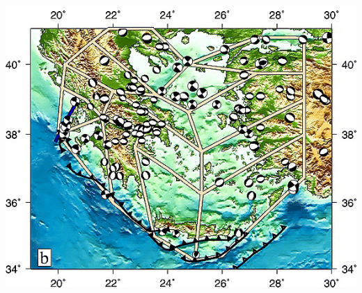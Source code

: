 \begin{frame}[t]
\begin{columns}
\begin{column}{.48\textwidth}
    \includegraphics[width=\linewidth]{floyd10_15bl.png}
  \end{column}
\end{columns}
\end{frame}
\note{} %